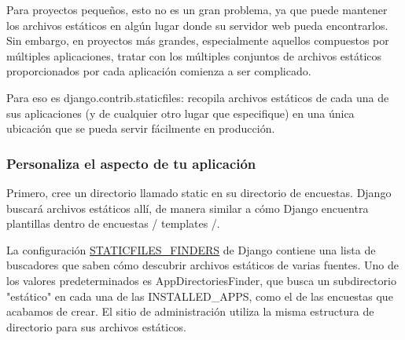 \documentclass[10pt]{article}
\newcommand{\django}[1]{{\textcolor{G}{Django} #1}}
\begin{document}
Para proyectos pequeños, esto no es un gran problema, ya que puede mantener los archivos estáticos en algún lugar donde su servidor web pueda encontrarlos. Sin embargo, en proyectos más grandes, especialmente aquellos compuestos por múltiples aplicaciones, tratar con los múltiples conjuntos de archivos estáticos proporcionados por cada aplicación comienza a ser complicado.

Para eso es \textcolor{G}{django.contrib.staticfiles}: recopila archivos estáticos de cada una de sus aplicaciones (y de cualquier otro lugar que especifique) en una única ubicación que se pueda servir fácilmente en producción.

\subsubsection{Personaliza el aspecto de tu aplicación}
Primero, cree un directorio llamado static en su directorio de encuestas. Django buscará archivos estáticos allí, de manera similar a cómo Django encuentra plantillas dentro de encuestas / templates /.

La configuración {\href{https://docs.djangoproject.com/en/3.0/ref/settings/\#std:setting-STATICFILES\_FINDERS}{\textcolor{G}{STATICFILES\_FINDERS}}} de \django{} contiene una lista de buscadores que saben cómo descubrir archivos estáticos de varias fuentes. Uno de los valores predeterminados es \textcolor{G}{AppDirectoriesFinder}, que busca un subdirectorio "estático" en cada una de las \textcolor{G}{INSTALLED\_APPS}, como el de las encuestas que acabamos de crear. El sitio de administración utiliza la misma estructura de directorio para sus archivos estáticos.
\end{document}

